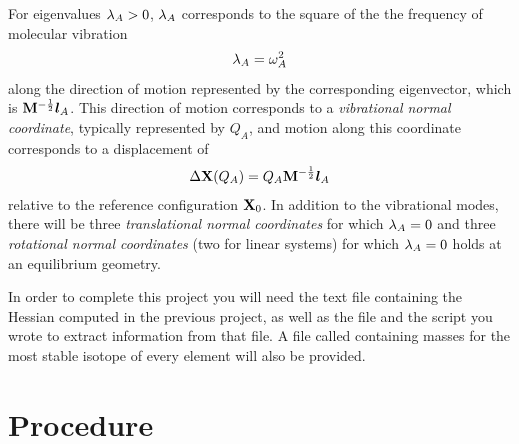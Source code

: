 \documentclass[11pt]{article}
\begin{document}
For eigenvalues $\lambda_A>0$, $\lambda_A$ corresponds to the square of the the frequency of molecular vibration
\begin{align}
	\lambda_A = \omega_A^2
\end{align}
along the direction of motion represented by the corresponding eigenvector, which is $\mathbf{M}^{-\frac{1}{2}}\bm{l}_A$.
This direction of motion corresponds to a {\it vibrational normal coordinate}, typically represented by $Q_A$, and motion along this coordinate corresponds to a displacement of
\begin{align}
%
	\D\bo{X}(Q_A)
=
	Q_A\bo{M}^{-\frac{1}{2}}\bm{l}_A
\end{align}
relative to the reference configuration $\mathbf{X}_0$.
In addition to the vibrational modes, there will be three {\it translational normal coordinates} for which $\lambda_A=0$ and three {\it rotational normal coordinates} (two for linear systems) for which $\lambda_A=0$ holds at an equilibrium geometry.

In order to complete this project you will need the text file containing the Hessian computed in the previous project, as well as the file  and the script you wrote to extract information from that file.
A file called  containing masses for the most stable isotope of every element will also be provided.


\newpage
\section{Procedure}
\end{document}
